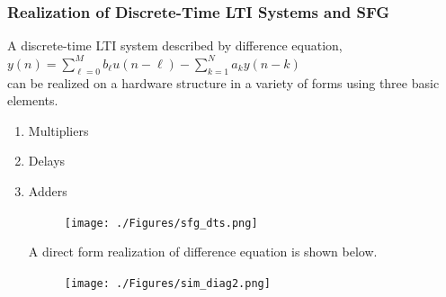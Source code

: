 \documentclass[mathserif, 10pt]{beamer} %
\begin{document}
\frame
{

\normalsize

\frametitle{Realization of Discrete-Time LTI Systems and SFG}

A discrete-time LTI system described by difference equation,\\
$y(n) = \sum\limits_{\ell=0}^M b_{\ell} u(n-\ell) - \sum\limits_{k=1}^N a_k y(n-k)$\\
can be realized on a hardware structure in a variety of forms using three basic elements.
\begin{enumerate}
\item Multipliers \\ \vspace{.07in}
	\item Delays     \\ \vspace{.07in}
	\item Adders	\\
\vspace{-.75in}
\begin{figure}[h!]

\hspace{1in}
\texttt{[image: ./Figures/sfg\_dts.png]}
\end{figure}
	
A direct form realization of difference equation is shown below.\\

\begin{figure}[h!]
\texttt{[image: ./Figures/sim\_diag2.png]}
\end{figure}


\end{enumerate}


}
\end{document}
